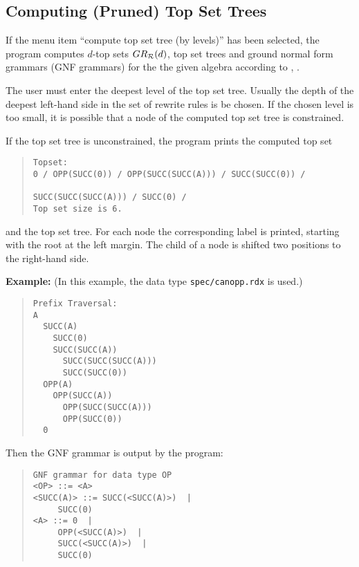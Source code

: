 \subsection{Computing (Pruned) Top Set Trees}
\label{TopSetTrees}%
If the menu item ``compute top set tree (by levels)'' has been 
selected, the program computes \(d\)-top sets $GR_{\cal R}(d)$, top set 
trees and ground normal form grammars (GNF grammars) for
the the given algebra according to \cite{Buendgen:91},
\cite{BuendgenEckhardt:92}.

The user must enter the deepest level of the top set tree.
Usually the depth of the
deepest left-hand side in the set of rewrite rules is be  chosen.
If the chosen level is too small, it is possible that a node of the computed
top set tree is constrained.

If the top set tree is unconstrained, the program prints the computed 
top set 

\begin{quote}
\begin{verbatim}
Topset: 
0 / OPP(SUCC(0)) / OPP(SUCC(SUCC(A))) / SUCC(SUCC(0)) /
                                              SUCC(SUCC(SUCC(A))) / SUCC(0) /
Top set size is 6.
\end{verbatim}
\end{quote}

and the top set tree.
For each node the corresponding label is printed, starting with the root
at the left margin.
The  child of a node is shifted two positions to the right-hand side.

\noindent
{\bf Example:} (In this example, the data type {\tt spec/canopp.rdx} is used.)
\begin{quote}
\begin{verbatim}
Prefix Traversal: 
A
  SUCC(A)
    SUCC(0)
    SUCC(SUCC(A))
      SUCC(SUCC(SUCC(A)))
      SUCC(SUCC(0))
  OPP(A)
    OPP(SUCC(A))
      OPP(SUCC(SUCC(A)))
      OPP(SUCC(0))
  0
\end{verbatim}
\end{quote}

Then the GNF grammar is output by the program:
\begin{quote} 
\begin{verbatim}
GNF grammar for data type OP
<OP> ::= <A>
<SUCC(A)> ::= SUCC(<SUCC(A)>)  |
     SUCC(0)
<A> ::= 0  |
     OPP(<SUCC(A)>)  |
     SUCC(<SUCC(A)>)  |
     SUCC(0)
\end{verbatim}
\end{quote}

